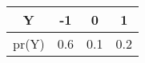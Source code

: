 \begin{tabular}{|c|c|c|c|}
\hline
Y 	&-1	&0	&1\\
\hline
pr(Y)	&0.6	&0.1	&0.2\\
\hline
\end{tabular}
